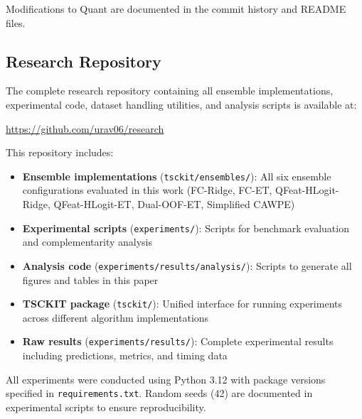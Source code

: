 \documentclass[pdflatex,sn-basic]{sn-jnl}           %
\theoremstyle{thmstyleone}%
\theoremstyle{thmstyletwo}%
\theoremstyle{thmstylethree}%
\begin{document}
\begin{appendices}
\noindent Modifications to Quant are documented in the commit history and README files.

\subsection{Research Repository}

\noindent The complete research repository containing all ensemble implementations, experimental code, dataset handling utilities, and analysis scripts is available at:

\url{https://github.com/urav06/research}

\noindent This repository includes:

\begin{itemize}
\item \textbf{Ensemble implementations} (\texttt{tsckit/ensembles/}): All six ensemble configurations evaluated in this work (FC-Ridge, FC-ET, QFeat-HLogit-Ridge, QFeat-HLogit-ET, Dual-OOF-ET, Simplified CAWPE)
\item \textbf{Experimental scripts} (\texttt{experiments/}): Scripts for benchmark evaluation and complementarity analysis
\item \textbf{Analysis code} (\texttt{experiments/results/analysis/}): Scripts to generate all figures and tables in this paper
\item \textbf{TSCKIT package} (\texttt{tsckit/}): Unified interface for running experiments across different algorithm implementations
\item \textbf{Raw results} (\texttt{experiments/results/}): Complete experimental results including predictions, metrics, and timing data
\end{itemize}

\noindent All experiments were conducted using Python 3.12 with package versions specified in \texttt{requirements.txt}. Random seeds (42) are documented in experimental scripts to ensure reproducibility.

\end{appendices}

\clearpage


\end{document}
